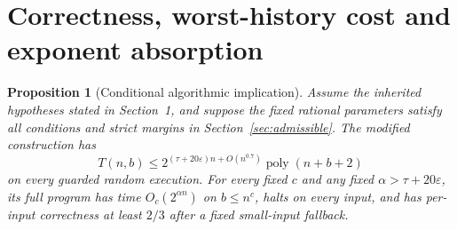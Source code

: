 \documentclass[11pt]{article}
\newtheorem{proposition}[theorem]{Proposition}
\theoremstyle{remark}\newtheorem*{remark}{Scope}
\newcommand{\eps}{\varepsilon}
\newcommand{\poly}{\operatorname{poly}}
\begin{document}
\section{Correctness, worst-history cost and exponent absorption}
\begin{proposition}[Conditional algorithmic implication]\label{prop:algorithm}
Assume the inherited hypotheses stated in Section~1, and suppose the
fixed rational parameters satisfy all conditions and strict margins
in Section~\ref{sec:admissible}. The modified construction has
\[
 T(n,b)\le2^{(\tau+20\eps)n+O(n^{0.7})}\poly(n+b+2)
\]
on every guarded random execution. For every fixed $c$ and any fixed
$\alpha>\tau+20\eps$, its full program has time
$O_c(2^{\alpha n})$ on $b\le n^c$, halts on every input, and has
per-input correctness at least $2/3$ after a fixed small-input fallback.
\end{proposition}
\end{document}
